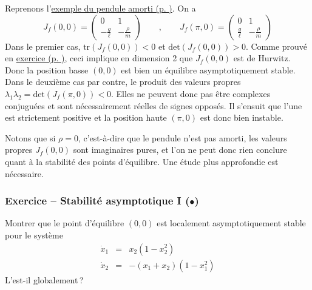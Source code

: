 \hypertarget{ex_pendule_jacob}{}
\begin{exemple}\label{ex_pendule_jacob}
Reprenons l'\protect\hyperlink{ex_pendule}{exemple du pendule amorti (p.
\pageref*{ex_pendule})}. On a \[
J_f(0,0) = \left( \begin{matrix} 
0 & 1\\
-\frac{g}{\ell} & - \frac{\rho}{m}
\end{matrix}
\right) 
\qquad , \qquad 
J_f(\pi,0)= \left( \begin{matrix} 
0 & 1\\
\frac{g}{\ell} & - \frac{\rho}{m}
\end{matrix}
\right) 
\] Dans le premier cas, \(\text{tr}(J_f(0,0))<0\) et
\(\text{det}(J_f(0,0))>0\). Comme prouvé en
\protect\hyperlink{crit_stab_dim2}{exercice (p.
\pageref*{crit_stab_dim2})}, ceci implique en dimension 2 que
\(J_f(0,0)\) est de Hurwitz. Donc la position basse \((0,0)\) est bien
un équilibre asymptotiquement stable. Dans le deuxième cas par contre,
le produit des valeurs propres
\(\lambda_1\lambda_2 = \text{det}(J_f(\pi,0))<0\). Elles ne peuvent donc
pas être complexes conjuguées et sont nécessairement réelles de signes
opposés. Il s'ensuit que l'une est strictement positive et la position
haute \((\pi,0)\) est donc bien instable.

Notons que si \(\rho=0\), c'est-à-dire que le pendule n'est pas amorti,
les valeurs propres \(J_f(0,0)\) sont imaginaires pures, et l'on ne peut
donc rien conclure quant à la stabilité des points d'équilibre. Une
étude plus approfondie est nécessaire.
\end{exemple}

\hypertarget{asymp_glob-1}{%
\subsubsection*{\texorpdfstring{Exercice -- Stabilité asymptotique I
(\(\mathord{\bullet}\))}{Exercice -- Stabilité asymptotique I (•)}}\label{asymp_glob-1}}


Montrer que le point d'équilibre \((0,0)\) est localement
asymptotiquement stable pour le système \[
\begin{array}{rcl}
\dot{x}_1 &=& x_2(1-x_2^2)\\
\dot{x}_2 &=& -(x_1+x_2)(1-x_1^2)
\end{array}
\] L'est-il globalement\,?

